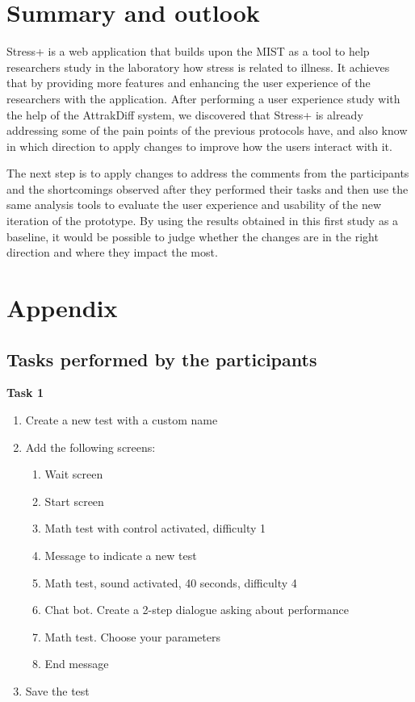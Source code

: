 \documentclass[conference]{IEEEtran}
\begin{document}
\section{Summary and outlook}
\label{sec:org8db07b4}

Stress+ is a web application that builds upon the MIST as a tool to help
researchers study in the laboratory how stress is related to illness. It
achieves that by providing more features and enhancing the user experience of
the researchers with the application. After performing a user experience study
with the help of the AttrakDiff system, we discovered that Stress+ is already
addressing some of the pain points of the previous protocols have, and also know
in which direction to apply changes to improve how the users interact with it.

The next step is to apply changes to address the comments from the participants
and the shortcomings observed after they performed their tasks and then use the
same analysis tools to evaluate the user experience and usability of the new
iteration of the prototype. By using the results obtained in this first study as
a baseline, it would be possible to judge whether the changes are in the right
direction and where they impact the most.






\newpage
\section{Appendix}
\label{sec:orgec501f8}

\subsection{Tasks performed by the participants}
\label{sec:protocol}
\textbf{Task 1}

\begin{enumerate}
\item Create a new test with a custom name

\item Add the following screens:
\begin{enumerate}
\item Wait screen
\item Start screen
\item Math test with control activated, difficulty 1
\item Message to indicate a new test
\item Math test, sound activated, 40 seconds, difficulty 4
\item Chat bot. Create a 2-step dialogue asking about performance
\item Math test. Choose your parameters
\item End message
\end{enumerate}

\item Save the test
\end{enumerate}
\end{document}
